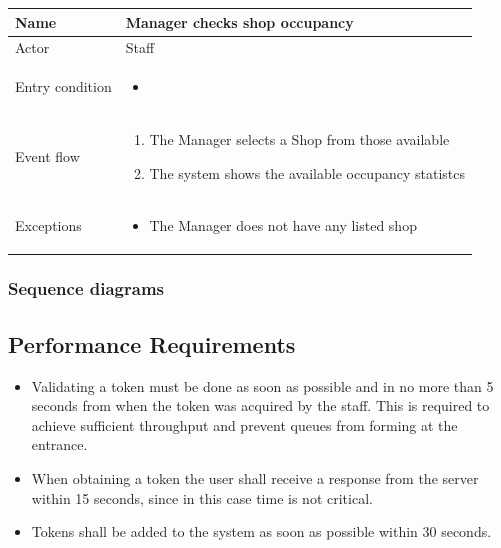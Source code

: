 \begin{table}[H]
    \begin{tabu} to \textwidth {|X|X[4]|}
        \hline
        Name            & Manager checks shop occupancy \\ \hline
        Actor           & Staff                         \\ \hline
        Entry condition & \begin{itemize}
            \item {}
        \end{itemize}    \\ \hline
        Event flow      & \begin{enumerate}
            \item The Manager selects a Shop from those available
            \item The system shows the available occupancy statistcs
        \end{enumerate}    \\ \hline
        Exceptions      & \begin{itemize}
            \item The Manager does not have any listed shop
        \end{itemize}    \\ \hline
    \end{tabu}
\end{table}

\subsubsection{Sequence diagrams}

%     
\subsection{Performance Requirements}
\begin{itemize}
    \item Validating a token must be done as soon as possible and in no more than 5 seconds from when the token was acquired by the staff. This is required to achieve sufficient throughput and prevent queues from forming at the entrance.
    \item When obtaining a token the user shall receive a response from the server within 15 seconds, since in this case time is not critical.
    \item Tokens shall be added to the system as soon as possible within 30 seconds.
\end{itemize}
